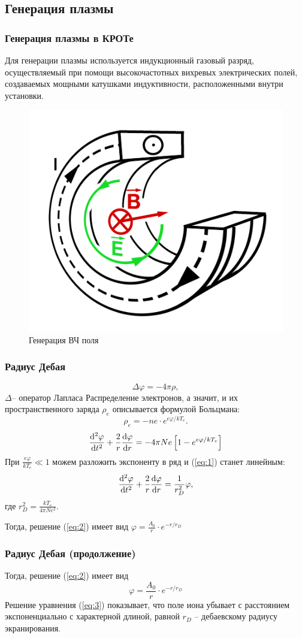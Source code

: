 \documentclass[10pt,pdf,hyperref={unicode}, dvipsnames]{beamer}
\renewcommand{\phi}{\varphi}
\begin{document}
\subsection{Генерация плазмы}
\begin{frame}
	\frametitle{Генерация плазмы в КРОТе}
	Для генерации плазмы используется индукционный газовый разряд, осуществляемый при помощи высокочастотных вихревых электрических
	полей, создаваемых мощными катушками индуктивности, расположенными внутри установки.
	\begin{figure}[H]
		\begin{minipage}{\linewidth}
				\centering
				\includegraphics[width=0.4\linewidth]{fig/induct}
				\caption{Генерация ВЧ поля}
				\label{fig:resonator}
		\end{minipage}
		\end{figure}

\begin{frame}[t]\frametitle{Радиус Дебая}
\begin{equation}
	\Delta\phi= -4\pi\rho,
\end{equation}
$\Delta$-- оператор Лапласа
Распределение электронов,
а значит, и их пространственного заряда
$\rho_e$ описывается формулой Больцмана:
\begin{equation}
	\rho_e= -ne\cdot e^{e\phi/kT_e}.
\end{equation}
\begin{equation}
	\label{eq:1}
	\dv[2]{\phi}{t}+\frac2r\dv{\phi}{r}=-4\pi Ne\left[1 -e^{e\phi/kT_e}\right]
\end{equation}
При $\displaystyle \frac{e\phi}{kT_e}\ll1$ можем разложить экспоненту в ряд и (\ref{eq:1}) станет линейным:
\begin{equation}
	\label{eq:2}
	\dv[2]{\phi}{t}+\frac2r\dv{\phi}{r}=\frac{1}{r_D^2}\phi,
\end{equation}
где $\displaystyle r_D^2=\frac{kT_e}{4\pi Ne^2}$.

Тогда, решение (\ref{eq:2}) имеет вид $\displaystyle \phi=\frac{A_0}{r}\cdot e^{-r/r_D}$

\end{frame}
\begin{frame}[t]\frametitle{Радиус Дебая (продолжение)}
	Тогда, решение (\ref{eq:2}) имеет вид 
	\begin{equation}
		\label{eq:3}
		\phi=\frac{A_0}{r}\cdot e^{-r/r_D}
	\end{equation}  
    Решение уравнения (\ref{eq:3}) показывает, что поле иона убывает с расстоянием экспоненциально с характерной длиной, равной $r_D$ -- дебаевскому радиусу экранирования. 


\end{frame}
\end{frame}
\end{document}
